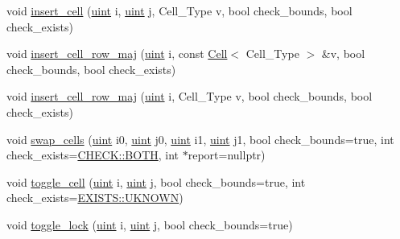 \begin{Indent}
\begin{DoxyCompactItemize}
\item 
void \hyperlink{class_b_array_a4790d707fcf6a5b552816258922ca25b}{insert\+\_\+cell} (\hyperlink{typedefs_8hpp_a91ad9478d81a7aaf2593e8d9c3d06a14}{uint} i, \hyperlink{typedefs_8hpp_a91ad9478d81a7aaf2593e8d9c3d06a14}{uint} j, Cell\+\_\+\+Type v, bool check\+\_\+bounds, bool check\+\_\+exists)
\item 
void \hyperlink{class_b_array_a32ce549812fcac0af0a39c3ba0a22add}{insert\+\_\+cell\+\_\+row\+\_\+maj} (\hyperlink{typedefs_8hpp_a91ad9478d81a7aaf2593e8d9c3d06a14}{uint} i, const \hyperlink{class_cell}{Cell}$<$ Cell\+\_\+\+Type $>$ \&v, bool check\+\_\+bounds, bool check\+\_\+exists)
\item 
void \hyperlink{class_b_array_aec0c657e14fd003cc6d4428a816d28aa}{insert\+\_\+cell\+\_\+row\+\_\+maj} (\hyperlink{typedefs_8hpp_a91ad9478d81a7aaf2593e8d9c3d06a14}{uint} i, Cell\+\_\+\+Type v, bool check\+\_\+bounds, bool check\+\_\+exists)
\item 
void \hyperlink{class_b_array_afb7976f67770b850922c1a7e1d6b07cc}{swap\+\_\+cells} (\hyperlink{typedefs_8hpp_a91ad9478d81a7aaf2593e8d9c3d06a14}{uint} i0, \hyperlink{typedefs_8hpp_a91ad9478d81a7aaf2593e8d9c3d06a14}{uint} j0, \hyperlink{typedefs_8hpp_a91ad9478d81a7aaf2593e8d9c3d06a14}{uint} i1, \hyperlink{typedefs_8hpp_a91ad9478d81a7aaf2593e8d9c3d06a14}{uint} j1, bool check\+\_\+bounds=true, int check\+\_\+exists=\hyperlink{namespace_c_h_e_c_k_a3acda1c74bfabb5b6b67e19d0ad2d52a}{C\+H\+E\+C\+K\+::\+B\+O\+TH}, int $\ast$report=nullptr)
\item 
void \hyperlink{class_b_array_a2ab2b200b329abc718cfb3574f566cf6}{toggle\+\_\+cell} (\hyperlink{typedefs_8hpp_a91ad9478d81a7aaf2593e8d9c3d06a14}{uint} i, \hyperlink{typedefs_8hpp_a91ad9478d81a7aaf2593e8d9c3d06a14}{uint} j, bool check\+\_\+bounds=true, int check\+\_\+exists=\hyperlink{namespace_e_x_i_s_t_s_a81eb362d951445c658942a433afddb97}{E\+X\+I\+S\+T\+S\+::\+U\+K\+N\+O\+WN})
\item 
void \hyperlink{class_b_array_ac5079b33fc5300dd912cdf85bb51ac53}{toggle\+\_\+lock} (\hyperlink{typedefs_8hpp_a91ad9478d81a7aaf2593e8d9c3d06a14}{uint} i, \hyperlink{typedefs_8hpp_a91ad9478d81a7aaf2593e8d9c3d06a14}{uint} j, bool check\+\_\+bounds=true)
\end{DoxyCompactItemize}
\end{Indent}
